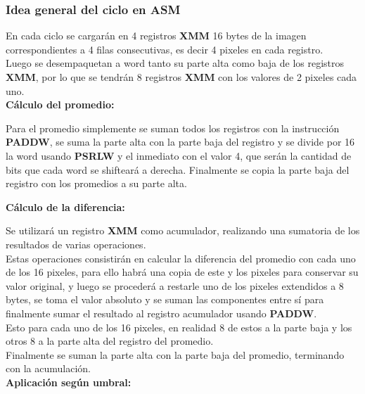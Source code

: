 \subsubsection{Idea general del ciclo en ASM}

En cada ciclo se cargarán en 4 registros \textbf{XMM} 16 bytes de la imagen correspondientes a 4 filas consecutivas, es decir 4 pixeles en cada registro. \\
Luego se desempaquetan a word tanto su parte alta como baja de los registros \textbf{XMM}, por lo que se tendrán 8 registros \textbf{XMM} con los valores de 2 pixeles cada uno.\\

{\centering\textbf{Cálculo del promedio:}}

Para el promedio simplemente se suman todos los registros con la instrucción \textbf{PADDW}, se suma la parte alta con la parte baja del registro y se divide por 16 la word usando \textbf{PSRLW} y el inmediato con el valor 4, que serán la cantidad de bits que cada word se shifteará a derecha.
Finalmente se copia la parte baja del registro con los promedios a su parte alta.

{\centering\textbf{Cálculo de la diferencia:}}

Se utilizará un registro \textbf{XMM} como acumulador, realizando una sumatoria de los resultados de varias operaciones.\\
Estas operaciones consistirán en calcular la diferencia del promedio con cada uno de los 16 pixeles, para ello habrá una copia de este y los pixeles para conservar su valor original, y luego se procederá a restarle uno de los pixeles extendidos a 8 bytes, se toma el valor absoluto y se suman las componentes entre sí para finalmente sumar el resultado al registro acumulador usando \textbf{PADDW}. \\
Esto para cada uno de los 16 pixeles, en realidad 8 de estos a la parte baja y los otros 8 a la parte alta del registro del promedio.  \\
Finalmente se suman la parte alta con la parte baja del promedio, terminando con la acumulación. \\

{\centering\textbf{Aplicación según umbral:}}

